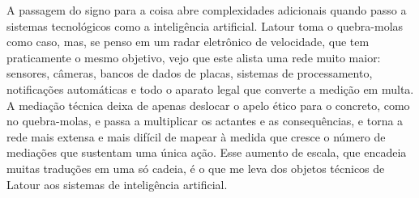 A passagem do signo para a coisa abre complexidades adicionais quando passo a sistemas tecnológicos como a inteligência artificial. Latour toma o quebra-molas como caso, mas, se penso em um radar eletrônico de velocidade, que tem praticamente o mesmo objetivo, vejo que este alista uma rede muito maior: sensores, câmeras, bancos de dados de placas, sistemas de processamento, notificações automáticas e todo o aparato legal que converte a medição em multa. A mediação técnica deixa de apenas deslocar o apelo ético para o concreto, como no quebra-molas, e passa a multiplicar os actantes e as consequências, e torna a rede mais extensa e mais difícil de mapear à medida que cresce o número de mediações que sustentam uma única ação. Esse aumento de escala, que encadeia muitas traduções em uma só cadeia, é o que me leva dos objetos técnicos de Latour aos sistemas de inteligência artificial.

